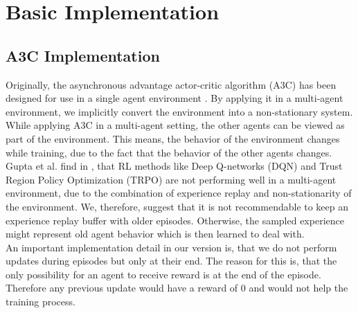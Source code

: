

%
%

\chapter{Basic Implementation}\label{chap.basic_implementation}
\section{A3C Implementation}\label{a3c_implementation}
Originally, the asynchronous advantage actor-critic algorithm (A3C) has been designed for use in a single agent environment \cite{a3c}.
By applying it in a multi-agent environment, we implicitly convert the environment into a non-stationary system.
While applying A3C in a multi-agent setting, the other agents can be viewed as part of the environment. This means, the behavior of the environment changes while training, due to the fact that the behavior of the other agents changes.
Gupta et al. find in \cite{multiagent_comp_a3c_dqn_etc}, that RL methods like Deep Q-networks (DQN) and Trust Region Policy Optimization (TRPO) are not performing well in a multi-agent environment, due to the combination of experience replay and non-stationarity of the environment. We, therefore, suggest that it is not recommendable to keep an experience replay buffer with older episodes. Otherwise, the sampled experience might represent old agent behavior which is then learned to deal with.\\
An important implementation detail in our version is, that we do not perform updates during episodes but only at their end. The reason for this is, that the only possibility for an agent to receive reward is at the end of the episode. Therefore any previous update would have a reward of 0 and would not help the training process.

